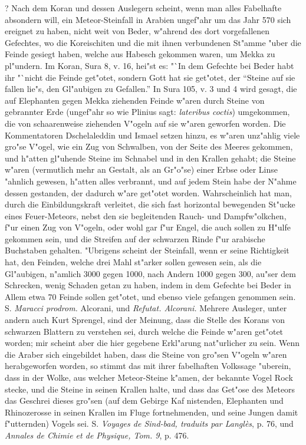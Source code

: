 \documentclass[a4paper, 11pt, oneside, polutonikogreek, german]{article}
\begin{document}
? Nach dem Koran und dessen Auslegern scheint, wenn man alles Fabelhafte absondern will, ein Meteor-Steinfall in Arabien ungef"ahr um das Jahr 570 sich ereignet zu haben, nicht weit von Beder, w"ahrend des dort vorgefallenen Gefechtes, wo die Koreischiten und die mit ihnen verbundenen St"amme "uber die Feinde gesiegt haben, welche aus Habesch gekommen waren, um Mekka zu pl"undern. Im Koran, Sura 8, v. 16, hei"st es: "`In dem Gefechte bei Beder habt ihr "`nicht die Feinde get"otet, sondern Gott hat sie get"otet, der "`Steine auf sie fallen lie"s, den Gl"aubigen zu Gefallen."' In Sura 105, v. 3 und 4 wird gesagt, die auf Elephanten gegen Mekka ziehenden Feinde w"aren durch Steine von gebrannter Erde (ungef"ahr so wie Plinius sagt: \emph{lateribus coctis}) umgekommen, die von schaarenweise ziehenden V"ogeln auf sie w"aren geworfen worden. Die Kommentatoren Dschelaleddin und Ismael setzen hinzu, es w"aren unz"ahlig viele gro"se V"ogel, wie ein Zug von Schwalben, von der Seite des Meeres gekommen, und h"atten gl"uhende Steine im Schnabel und in den Krallen gehabt; die Steine w"aren (vermutlich mehr an Gestalt, als an Gr"o"se) einer Erbse oder Linse "ahnlich gewesen, h"atten alles verbrannt, und auf jedem Stein habe der N"ahme dessen gestanden, der dadurch w"are get"otet worden. Wahrscheinlich hat man, durch die Einbildungskraft verleitet, die sich fast horizontal bewegenden St"ucke eines Feuer-Meteors, nebst den sie begleitenden Rauch- und Dampfw"olkchen, f"ur einen Zug von V"ogeln, oder wohl gar f"ur Engel, die auch sollen zu H"ulfe gekommen sein, und die Streifen auf der schwarzen Rinde f"ur arabische Buchstaben gehalten. "Ubrigens scheint der Steinfall, wenn er seine Richtigkeit hat, den Feinden, welche drei Mahl st"arker sollen gewesen sein, als die Gl"aubigen, n"amlich 3000 gegen 1000, nach Andern 1000 gegen 300, au"ser dem Schrecken, wenig Schaden getan zu haben, indem in dem Gefechte bei Beder in Allem etwa 70 Feinde sollen get"otet, und ebenso viele gefangen genommen sein. S. \emph{Maracci prodrom.} Alcorani, und \emph{Refutat. Alcorani.} Mehrere Ausleger, unter andern auch Kurt Sprengel, sind der Meinung, dass die Stelle des Korans von schwarzen Blattern zu verstehen sei, durch welche die Feinde w"aren get"otet worden; mir scheint aber die hier gegebene Erkl"arung nat"urlicher zu sein. Wenn die Araber sich eingebildet haben, dass die Steine von gro"sen V"ogeln w"aren herabgeworfen worden, so stimmt das mit ihrer fabelhaften Volkssage "uberein, dass in der Wolke, aus welcher Meteor-Steine k"amen, der bekannte Vogel Rock stecke, und die Steine in seinen Krallen halte, und dass das Get"ose des Meteors das Geschrei dieses gro"sen (auf dem Gebirge Kaf nistenden, Elephanten und Rhinozerosse in seinen Krallen im Fluge fortnehmenden, und seine Jungen damit f"utternden) Vogels sei. S. \emph{Voyages de Sind-bad, traduits par Langlès}, p. 76, und \emph{Annales de Chimie et de Physique, Tom. 9}, p. 476.
\end{document}
